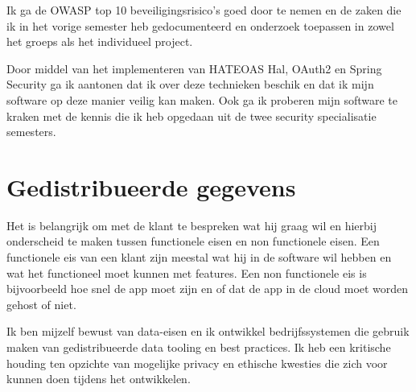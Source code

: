 Ik ga de OWASP top 10 beveiligingsrisico's goed door te nemen en de zaken die ik in het vorige semester heb
gedocumenteerd en onderzoek toepassen in zowel het groeps als het individueel project.

Door middel van het implementeren van HATEOAS Hal, OAuth2 en Spring Security ga ik aantonen dat ik over deze
technieken beschik en dat ik mijn software op deze manier veilig kan maken.
Ook ga ik proberen mijn software te kraken met de kennis die ik heb opgedaan uit de twee security specialisatie
semesters.





\section{Gedistribueerde gegevens}\label{sec:gedistribueerde-gegevens}

Het is belangrijk om met de klant te bespreken wat hij graag wil en hierbij onderscheid te maken tussen functionele
eisen en non functionele eisen.
Een functionele eis van een klant zijn meestal wat hij in de software wil hebben en wat het functioneel moet kunnen met features.
Een non functionele eis is bijvoorbeeld hoe snel de app moet zijn en of dat de app in de cloud moet worden gehost of
niet.

Ik ben mijzelf bewust van data-eisen en ik ontwikkel bedrijfssystemen die gebruik maken van gedistribueerde
data tooling en best practices.
Ik heb een kritische houding ten opzichte van mogelijke privacy en ethische kwesties die zich voor kunnen doen
tijdens het ontwikkelen.

